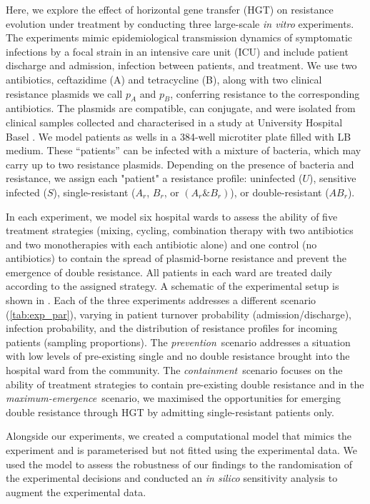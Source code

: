 Here, we explore the effect of horizontal gene transfer (HGT) on resistance evolution under treatment by conducting three large-scale \textit{in vitro} experiments. 
The experiments mimic epidemiological transmission dynamics of symptomatic infections by a focal strain in an intensive care unit (ICU) and include patient discharge and admission, infection between patients, and treatment.
We use two antibiotics, ceftazidime (A) and tetracycline (B), along with two clinical resistance plasmids \cite{Huisman2022} we call $p_A$ and $p_B$, conferring resistance to the corresponding antibiotics.
The plasmids are compatible, can conjugate, and were isolated from clinical samples collected and characterised in a study at University Hospital Basel \cite{Sutter2016}.
We model patients as wells in a 384-well microtiter plate filled with LB medium. 
These ``patients'' can be infected with a mixture of bacteria, which may carry up to two resistance plasmids. 
Depending on the presence of bacteria and resistance, we assign each "patient" a resistance profile: uninfected ($U$), sensitive infected ($S$), single-resistant ($A_r$, $B_r$, or $(A_r\&B_r)$), or double-resistant ($AB_r$).

In each experiment, we model six hospital wards to assess the ability of five treatment strategies (mixing, cycling, combination therapy with two antibiotics and two monotherapies with each antibiotic alone) and one control (no antibiotics) to contain the spread of plasmid-borne resistance and prevent the emergence of double resistance. 
All patients in each ward are treated daily according to the assigned strategy.
A schematic of the experimental setup is shown in .
Each of the three experiments addresses a different scenario (\autoref{tab:exp_par}), varying in patient turnover probability (admission/discharge),  infection probability, and the distribution of resistance profiles for incoming patients (sampling proportions). 
The \textit{prevention}~scenario addresses a situation with low levels of pre-existing single and no double resistance brought into the hospital ward from the community.
The \textit{containment}~scenario focuses on the ability of treatment strategies to contain pre-existing double resistance and in the \textit{maximum-emergence}~scenario, we maximised the opportunities for emerging double resistance through HGT by admitting single-resistant patients only.

Alongside our experiments, we created a computational model that mimics the experiment and is parameterised but not fitted using the experimental data.
We used the model to assess the robustness of our findings to the randomisation of the experimental decisions and conducted an \textit{in silico} sensitivity analysis to augment the experimental data.

